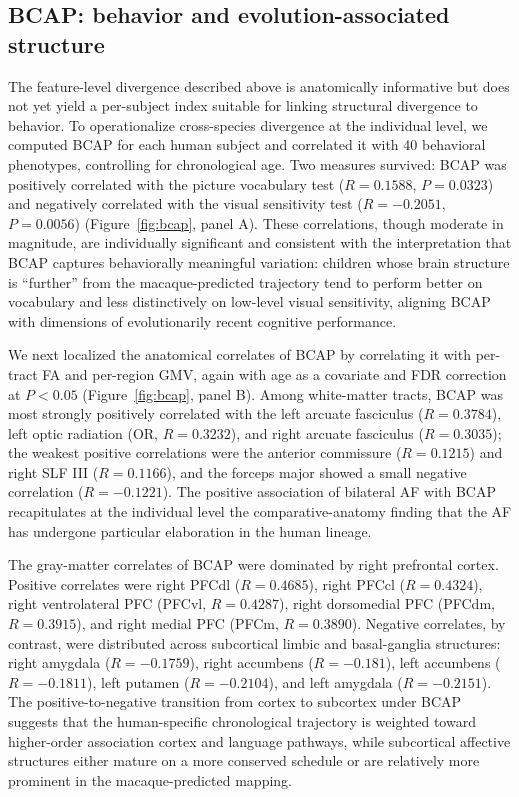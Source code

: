 \documentclass[11pt]{article}
\begin{document}
\subsection{BCAP: behavior and evolution-associated structure}

The feature-level divergence described above is anatomically informative but does not yet yield a per-subject index suitable for linking structural divergence to behavior. To operationalize cross-species divergence at the individual level, we computed BCAP for each human subject and correlated it with 40 behavioral phenotypes, controlling for chronological age. Two measures survived: BCAP was positively correlated with the picture vocabulary test ($R = 0.1588$, $P = 0.0323$) and negatively correlated with the visual sensitivity test ($R = -0.2051$, $P = 0.0056$) (Figure~\ref{fig:bcap}, panel A). These correlations, though moderate in magnitude, are individually significant and consistent with the interpretation that BCAP captures behaviorally meaningful variation: children whose brain structure is ``further'' from the macaque-predicted trajectory tend to perform better on vocabulary and less distinctively on low-level visual sensitivity, aligning BCAP with dimensions of evolutionarily recent cognitive performance.

We next localized the anatomical correlates of BCAP by correlating it with per-tract FA and per-region GMV, again with age as a covariate and FDR correction at $P < 0.05$ (Figure~\ref{fig:bcap}, panel B). Among white-matter tracts, BCAP was most strongly positively correlated with the left arcuate fasciculus ($R = 0.3784$), left optic radiation (OR, $R = 0.3232$), and right arcuate fasciculus ($R = 0.3035$); the weakest positive correlations were the anterior commissure ($R = 0.1215$) and right SLF III ($R = 0.1166$), and the forceps major showed a small negative correlation ($R = -0.1221$). The positive association of bilateral AF with BCAP recapitulates at the individual level the comparative-anatomy finding that the AF has undergone particular elaboration in the human lineage.

The gray-matter correlates of BCAP were dominated by right prefrontal cortex. Positive correlates were right PFCdl ($R = 0.4685$), right PFCcl ($R = 0.4324$), right ventrolateral PFC (PFCvl, $R = 0.4287$), right dorsomedial PFC (PFCdm, $R = 0.3915$), and right medial PFC (PFCm, $R = 0.3890$). Negative correlates, by contrast, were distributed across subcortical limbic and basal-ganglia structures: right amygdala ($R = -0.1759$), right accumbens ($R = -0.181$), left accumbens ($R = -0.1811$), left putamen ($R = -0.2104$), and left amygdala ($R = -0.2151$). The positive-to-negative transition from cortex to subcortex under BCAP suggests that the human-specific chronological trajectory is weighted toward higher-order association cortex and language pathways, while subcortical affective structures either mature on a more conserved schedule or are relatively more prominent in the macaque-predicted mapping.
\end{document}
